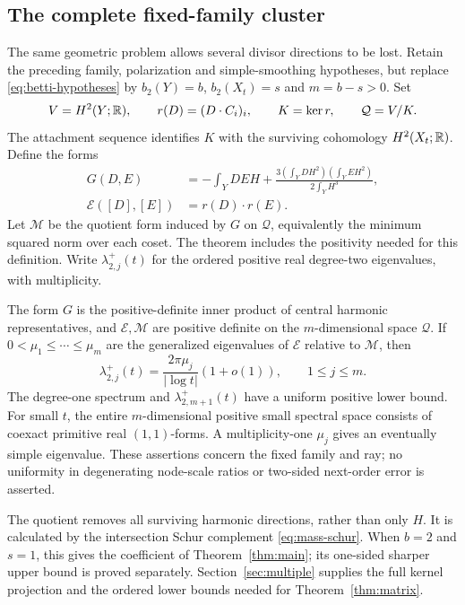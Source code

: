 \subsection{The complete fixed-family cluster}
The same geometric problem allows several divisor directions to be lost.
Retain the preceding family, polarization and simple-smoothing hypotheses,
but replace \eqref{eq:betti-hypotheses} by
$b_2(Y)=b$, $b_2(X_t)=s$ and $m=b-s>0$. Set
\[
 V=H^2(Y;\mathbb R),\qquad r(D)=(D\cdot C_i)_i,\qquad
 K=\ker r,\qquad \mathcal Q=V/K.
\]
The attachment sequence identifies $K$ with the surviving cohomology
$H^2(X_t;\mathbb R)$. Define the forms
\begin{equation}\label{eq:intro-matrix-data}
\begin{split}
 G(D,E)&=-\int_YDEH+
     \frac{3(\int_YDH^2)(\int_YEH^2)}{2\int_YH^3},\\
 \mathcal E([D],[E])&=r(D)\cdot r(E).
\end{split}
\end{equation}
Let $\mathcal M$ be the quotient form induced by $G$ on $\mathcal Q$,
equivalently the minimum squared norm over each coset.
The theorem includes the positivity needed for this definition.
Write $\lambda^+_{2,j}(t)$ for the ordered positive real degree-two
eigenvalues, with multiplicity.

\begin{theorem}\label{thm:matrix}
The form $G$ is the positive-definite inner product of central harmonic
representatives, and $\mathcal E,\mathcal M$ are positive definite on the $m$-dimensional
space $\mathcal Q$. If $0<\mu_1\le\cdots\le\mu_m$ are the
generalized eigenvalues of $\mathcal E$ relative to $\mathcal M$, then
\begin{equation}\label{eq:matrix-law}
 \lambda^+_{2,j}(t)=\frac{2\pi\mu_j}{|\log t|}(1+o(1)),
 \qquad 1\le j\le m.
\end{equation}
The degree-one spectrum and $\lambda^+_{2,m+1}(t)$ have a uniform
positive lower bound. For small $t$, the entire $m$-dimensional positive
small spectral space consists of coexact primitive real $(1,1)$-forms.
A multiplicity-one $\mu_j$ gives an eventually simple eigenvalue.
These assertions concern the fixed family and ray; no uniformity in
degenerating node-scale ratios or two-sided next-order error is asserted.
\end{theorem}

The quotient removes all surviving harmonic directions, rather than
only $H$. It is calculated by the intersection Schur complement
\eqref{eq:mass-schur}. When $b=2$ and $s=1$, this gives the coefficient
of Theorem~\ref{thm:main}; its one-sided sharper upper bound is proved
separately. Section~\ref{sec:multiple} supplies the full kernel
projection and the ordered lower bounds needed for
Theorem~\ref{thm:matrix}.

